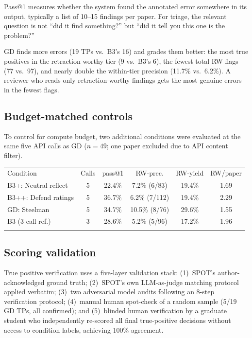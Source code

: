 \documentclass{ws-ijprai}
\begin{document}
Pass@1 measures whether the system found the annotated error somewhere in
its output, typically a list of 10--15 findings per paper. For triage, the
relevant question is not ``did it find something?'' but ``did it tell you
this one is the problem?''

GD finds more errors (19 TPs vs.\ B3's 16) and grades them better: the most
true positives in the retraction-worthy tier (9 vs.\ B3's 6), the fewest
total RW flags (77 vs.\ 97), and nearly double the within-tier precision
(11.7\% vs.\ 6.2\%). A reviewer who reads only retraction-worthy findings
gets the most genuine errors in the fewest flags.

\subsection{Budget-matched controls}

To control for compute budget, two additional conditions were evaluated at
the same five API calls as GD ($n=49$; one paper excluded due to API content
filter).

\begin{table}[h]
{\begin{tabular}{@{}lccccc@{}}
\toprule
Condition & Calls & pass@1 & RW-prec. & RW-yield & RW/paper \\
\colrule
B3+: Neutral reflect & 5 & 22.4\% & 7.2\% (6/83) & 19.4\% & 1.69 \\
B3++: Defend ratings & 5 & 36.7\% & 6.2\% (7/112) & 19.4\% & 2.29 \\
GD: Steelman & 5 & 34.7\% & 10.5\% (8/76) & 29.6\% & 1.55 \\
B3 (3-call ref.) & 3 & 28.6\% & 5.2\% (5/96) & 17.2\% & 1.96 \\
\botrule
\end{tabular}\label{tab:budget}}
\end{table}

\subsection{Scoring validation}

True positive verification uses a five-layer validation stack:
(1)~SPOT's author-acknowledged ground truth;
(2)~SPOT's own LLM-as-judge matching protocol applied verbatim;
(3)~two adversarial model audits following an 8-step verification protocol;
(4)~manual human spot-check of a random sample (5/19 GD TPs, all confirmed);
and (5)~blinded human verification by a graduate student who independently
re-scored all final true-positive decisions without access to condition
labels, achieving 100\% agreement.
\end{document}
